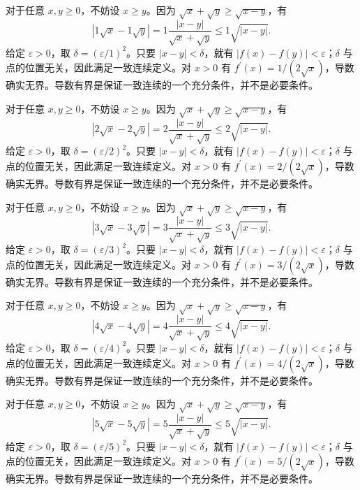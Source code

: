 \documentclass[12pt,fontset=fandol]{ctexart}
\begin{document}
\begin{solve}\label{ans:c6q13}
对于任意 $x,y\ge0$，不妨设 $x\ge y$。因为 $\sqrt x+\sqrt y\ge\sqrt{x-y}$，有
\[
|1\sqrt x-1\sqrt y|=1\frac{|x-y|}{\sqrt x+\sqrt y}\le 1\sqrt{|x-y|}.
\]
给定 $\varepsilon>0$，取 $\delta=(\varepsilon/1)^2$。只要 $|x-y|<\delta$，就有 $|f(x)-f(y)|<\varepsilon$；$\delta$ 与点的位置无关，因此满足一致连续定义。对 $x>0$ 有 $f^{\prime}(x)=1/(2\sqrt x)$，导数确实无界。导数有界是保证一致连续的一个充分条件，并不是必要条件。
\end{solve}

\begin{solve}\label{ans:c6q14}
对于任意 $x,y\ge0$，不妨设 $x\ge y$。因为 $\sqrt x+\sqrt y\ge\sqrt{x-y}$，有
\[
|2\sqrt x-2\sqrt y|=2\frac{|x-y|}{\sqrt x+\sqrt y}\le 2\sqrt{|x-y|}.
\]
给定 $\varepsilon>0$，取 $\delta=(\varepsilon/2)^2$。只要 $|x-y|<\delta$，就有 $|f(x)-f(y)|<\varepsilon$；$\delta$ 与点的位置无关，因此满足一致连续定义。对 $x>0$ 有 $f^{\prime}(x)=2/(2\sqrt x)$，导数确实无界。导数有界是保证一致连续的一个充分条件，并不是必要条件。
\end{solve}

\begin{solve}\label{ans:c6q15}
对于任意 $x,y\ge0$，不妨设 $x\ge y$。因为 $\sqrt x+\sqrt y\ge\sqrt{x-y}$，有
\[
|3\sqrt x-3\sqrt y|=3\frac{|x-y|}{\sqrt x+\sqrt y}\le 3\sqrt{|x-y|}.
\]
给定 $\varepsilon>0$，取 $\delta=(\varepsilon/3)^2$。只要 $|x-y|<\delta$，就有 $|f(x)-f(y)|<\varepsilon$；$\delta$ 与点的位置无关，因此满足一致连续定义。对 $x>0$ 有 $f^{\prime}(x)=3/(2\sqrt x)$，导数确实无界。导数有界是保证一致连续的一个充分条件，并不是必要条件。
\end{solve}

\begin{solve}\label{ans:c6q16}
对于任意 $x,y\ge0$，不妨设 $x\ge y$。因为 $\sqrt x+\sqrt y\ge\sqrt{x-y}$，有
\[
|4\sqrt x-4\sqrt y|=4\frac{|x-y|}{\sqrt x+\sqrt y}\le 4\sqrt{|x-y|}.
\]
给定 $\varepsilon>0$，取 $\delta=(\varepsilon/4)^2$。只要 $|x-y|<\delta$，就有 $|f(x)-f(y)|<\varepsilon$；$\delta$ 与点的位置无关，因此满足一致连续定义。对 $x>0$ 有 $f^{\prime}(x)=4/(2\sqrt x)$，导数确实无界。导数有界是保证一致连续的一个充分条件，并不是必要条件。
\end{solve}

\begin{solve}\label{ans:c6q17}
对于任意 $x,y\ge0$，不妨设 $x\ge y$。因为 $\sqrt x+\sqrt y\ge\sqrt{x-y}$，有
\[
|5\sqrt x-5\sqrt y|=5\frac{|x-y|}{\sqrt x+\sqrt y}\le 5\sqrt{|x-y|}.
\]
给定 $\varepsilon>0$，取 $\delta=(\varepsilon/5)^2$。只要 $|x-y|<\delta$，就有 $|f(x)-f(y)|<\varepsilon$；$\delta$ 与点的位置无关，因此满足一致连续定义。对 $x>0$ 有 $f^{\prime}(x)=5/(2\sqrt x)$，导数确实无界。导数有界是保证一致连续的一个充分条件，并不是必要条件。
\end{solve}
\end{document}
